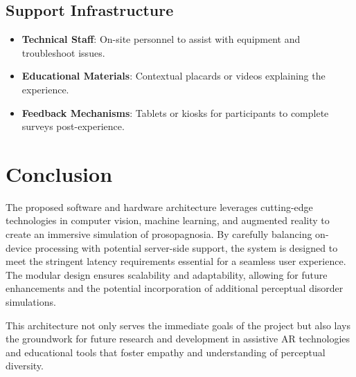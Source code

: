 \documentclass{article}
\begin{document}
\subsection{Support Infrastructure}

\begin{itemize}
    \item \textbf{Technical Staff}: On-site personnel to assist with equipment and troubleshoot issues.
    \item \textbf{Educational Materials}: Contextual placards or videos explaining the experience.
    \item \textbf{Feedback Mechanisms}: Tablets or kiosks for participants to complete surveys post-experience.
\end{itemize}

\section{Conclusion}

The proposed software and hardware architecture leverages cutting-edge technologies in computer vision, machine learning, and augmented reality to create an immersive simulation of prosopagnosia. By carefully balancing on-device processing with potential server-side support, the system is designed to meet the stringent latency requirements essential for a seamless user experience. The modular design ensures scalability and adaptability, allowing for future enhancements and the potential incorporation of additional perceptual disorder simulations.

This architecture not only serves the immediate goals of the project but also lays the groundwork for future research and development in assistive AR technologies and educational tools that foster empathy and understanding of perceptual diversity.


\end{document}

